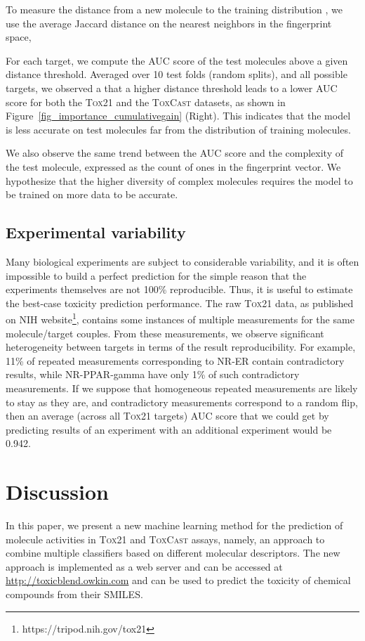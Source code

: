 \documentclass[11pt,a4paper]{article}
\begin{document}
To measure the distance from a new molecule  to the training distribution , 
we use the average Jaccard distance on the  nearest neighbors in the fingerprint space, 


For each target, we compute the AUC score of the test molecules above a given distance threshold.
Averaged over 10 test folds (random splits), and all possible targets, we observed a that a higher 
distance threshold leads to a lower AUC score for both the \textsc{Tox21} and the \textsc{ToxCast} 
datasets, as shown in Figure~\ref{fig_importance_cumulativegain} (Right). This indicates that the model is less accurate on 
test molecules far from the distribution of training molecules. 

We also observe the same trend between the AUC score and the complexity of the test molecule, 
expressed as the count of ones in the fingerprint vector. We hypothesize that the higher diversity 
of complex molecules requires the model to be trained on more data to be accurate.

\subsection{Experimental variability}
Many biological experiments are subject to considerable variability, and it is
often impossible to build a perfect prediction for the simple reason that
the experiments themselves are not 100\% reproducible. 
Thus, it is useful to estimate the best-case toxicity prediction performance.  
The raw \textsc{Tox21} data, as published on 
NIH website\footnote{https://tripod.nih.gov/tox21},   
contains some instances of multiple measurements for the same molecule/target
couples. 
From these measurements, we observe significant heterogeneity between 
targets in terms of the result reproducibility. 
For example, 11\% of repeated measurements corresponding to NR-ER
contain contradictory results, while NR-PPAR-gamma have only 1\% of such
contradictory measurements. 
If we suppose that homogeneous repeated measurements are likely
to stay as they are, and contradictory measurements correspond to a random flip,
then an average (across all \textsc{Tox21} targets) AUC score that we could get by
predicting results of an experiment with an additional experiment would be 0.942.   

\section{Discussion}
In this paper, we present a new machine learning method for the prediction of
molecule activities in \textsc{Tox21} and \textsc{ToxCast} assays, 
namely, an approach to combine  multiple classifiers based on different molecular
descriptors. The new approach is implemented as a web server and can be accessed
at \url{http://toxicblend.owkin.com} and can be used to predict the toxicity of
chemical compounds from their SMILES.      
\end{document}
